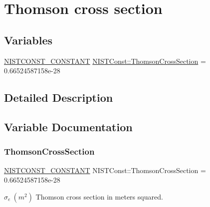 \hypertarget{group___n_i_s_t_const-_thomson}{}\section{Thomson cross section}
\label{group___n_i_s_t_const-_thomson}
\subsection*{Variables}
\begin{DoxyCompactItemize}
\item 
\mbox{\hyperlink{group___n_i_s_t_const-_macros_ga2b0fc1d7452373f816175dd86ce26729}{N\+I\+S\+T\+C\+O\+N\+S\+T\+\_\+\+C\+O\+N\+S\+T\+A\+NT}} \mbox{\hyperlink{group___n_i_s_t_const-_thomson_gab8adbacb38cef2b9b883e8bbe6a4b524}{N\+I\+S\+T\+Const\+::\+Thomson\+Cross\+Section}} = 0.\+66524587158e-\/28
\end{DoxyCompactItemize}


\subsection{Detailed Description}


\subsection{Variable Documentation}
\mbox{\label{group___n_i_s_t_const-_thomson_gab8adbacb38cef2b9b883e8bbe6a4b524}} 
\subsubsection{\texorpdfstring{Thomson\+Cross\+Section}{ThomsonCrossSection}}
{\footnotesize\ttfamily \mbox{\hyperlink{group___n_i_s_t_const-_macros_ga2b0fc1d7452373f816175dd86ce26729}{N\+I\+S\+T\+C\+O\+N\+S\+T\+\_\+\+C\+O\+N\+S\+T\+A\+NT}} N\+I\+S\+T\+Const\+::\+Thomson\+Cross\+Section = 0.\+66524587158e-\/28}

$\sigma_e \ (m^2)$ Thomson cross section in meters squared. 